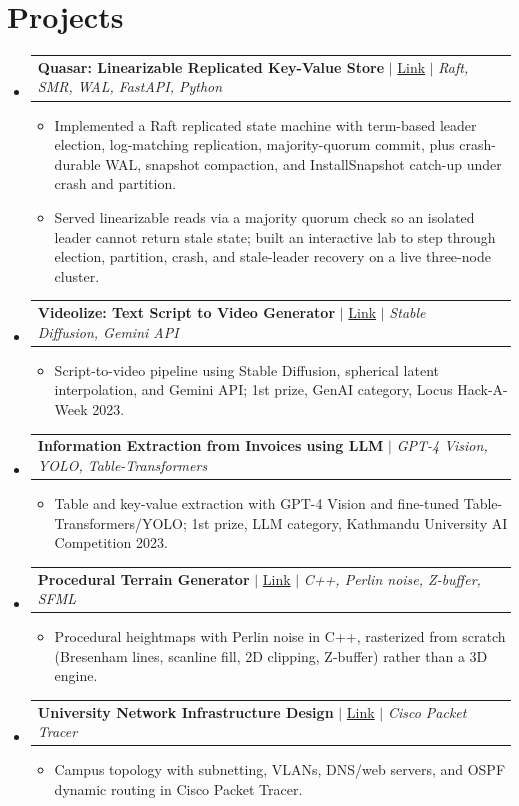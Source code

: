 \documentclass[letterpaper,11pt]{article}
\makeatletter
\newcommand{\resumeItem}[1]{
  \item\small{
    {#1 \vspace{-2pt}}
  }
}
\newcommand{\resumeProjectHeading}[2]{
    \item
    \begin{tabular*}{0.97\textwidth}{l@{\extracolsep{\fill}}r}
      \small#1 & #2 \\
    \end{tabular*}\vspace{-1pt}
}
\newcommand{\resumeProjectListStart}{\begin{itemize}[leftmargin=0.15in, label={}, itemsep=8pt, parsep=0pt, topsep=2pt]}
\newcommand{\resumeSubHeadingListEnd}{\end{itemize}}
\newcommand{\resumeOpenItemListStart}{\begin{itemize}[leftmargin=0.2in, itemsep=2pt, parsep=0pt, topsep=2pt]}
\newcommand{\resumeOpenItemListEnd}{\end{itemize}\vspace{-2pt}}
\makeatother
\begin{document}
\section{Projects}
    \resumeProjectListStart
      \resumeProjectHeading
          {\textbf{Quasar: Linearizable Replicated Key-Value Store} $|$ \href{https://github.com/avisekksarma/nebula/tree/main/projects/quasar}{Link} $|$ \emph{Raft, SMR, WAL, FastAPI, Python}}{}
          \resumeOpenItemListStart
            \resumeItem{Implemented a Raft replicated state machine with term-based leader election, log-matching replication, majority-quorum commit, plus crash-durable WAL, snapshot compaction, and InstallSnapshot catch-up under crash and partition.}
            \resumeItem{Served linearizable reads via a majority quorum check so an isolated leader cannot return stale state; built an interactive lab to step through election, partition, crash, and stale-leader recovery on a live three-node cluster.}
          \resumeOpenItemListEnd
      \resumeProjectHeading
          {\textbf{Videolize: Text Script to Video Generator} $|$ \href{https://github.com/avisekksarma/slerp-diffusion}{Link} $|$ \emph{Stable Diffusion, Gemini API}}{}
          \resumeOpenItemListStart
            \resumeItem{Script-to-video pipeline using Stable Diffusion, spherical latent interpolation, and Gemini API; 1st prize, GenAI category, Locus Hack-A-Week 2023.}
          \resumeOpenItemListEnd
      \resumeProjectHeading
          {\textbf{Information Extraction from Invoices using LLM} $|$ \emph{GPT-4 Vision, YOLO, Table-Transformers}}{}
          \resumeOpenItemListStart
            \resumeItem{Table and key-value extraction with GPT-4 Vision and fine-tuned Table-Transformers/YOLO; 1st prize, LLM category, Kathmandu University AI Competition 2023.}
          \resumeOpenItemListEnd
      \resumeProjectHeading
          {\textbf{Procedural Terrain Generator} $|$ \href{https://github.com/avisekksarma/Procedural-Terrain-Generator}{Link} $|$ \emph{C++, Perlin noise, Z-buffer, SFML}}{}
          \resumeOpenItemListStart
            \resumeItem{Procedural heightmaps with Perlin noise in C++, rasterized from scratch (Bresenham lines, scanline fill, 2D clipping, Z-buffer) rather than a 3D engine.}
          \resumeOpenItemListEnd
      \resumeProjectHeading
          {\textbf{University Network Infrastructure Design} $|$ \href{https://github.com/avisekksarma/Computer-Network-Project}{Link} $|$ \emph{Cisco Packet Tracer}}{}
          \resumeOpenItemListStart
            \resumeItem{Campus topology with subnetting, VLANs, DNS/web servers, and OSPF dynamic routing in Cisco Packet Tracer.}
          \resumeOpenItemListEnd
    \resumeSubHeadingListEnd
\end{document}
